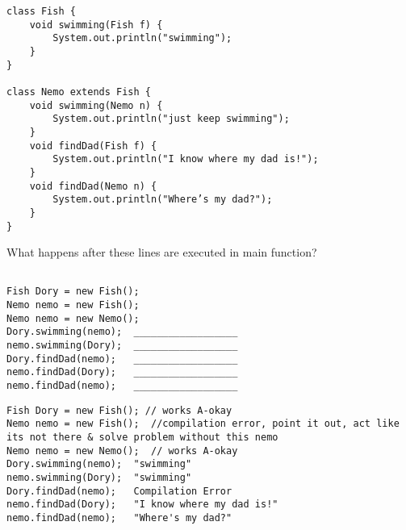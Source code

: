 \begin{blocksection}
\question
\begin{lstlisting}
class Fish {
    void swimming(Fish f) {
        System.out.println("swimming");
    }
}

class Nemo extends Fish {
    void swimming(Nemo n) {
        System.out.println("just keep swimming");
    }
    void findDad(Fish f) {
        System.out.println("I know where my dad is!");
    }
    void findDad(Nemo n) {
        System.out.println("Where’s my dad?");
    }
}

\end{lstlisting}

What happens after these lines are executed in main function?

\begin{verbatim}

Fish Dory = new Fish(); 
Nemo nemo = new Fish();  
Nemo nemo = new Nemo();  
Dory.swimming(nemo);  __________________
nemo.swimming(Dory);  __________________
Dory.findDad(nemo);   __________________
nemo.findDad(Dory);   __________________
nemo.findDad(nemo);   __________________

\end{verbatim}
\newpage
\begin{solution}
\begin{verbatim}
Fish Dory = new Fish(); // works A-okay
Nemo nemo = new Fish();  //compilation error, point it out, act like its not there & solve problem without this nemo
Nemo nemo = new Nemo();  // works A-okay
Dory.swimming(nemo);  "swimming"
nemo.swimming(Dory);  "swimming"
Dory.findDad(nemo);   Compilation Error
nemo.findDad(Dory);   "I know where my dad is!"
nemo.findDad(nemo);   "Where's my dad?"

\end{verbatim}
\end{solution}

\end{blocksection}